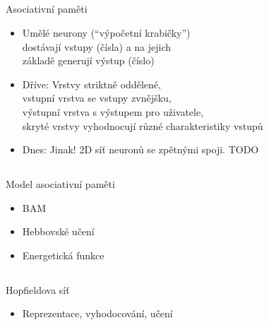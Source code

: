 \documentclass{beamer}
\begin{document}
\subsection{}
\begin{frame}{Asociativní paměti}
\begin{itemize}
\item Umělé neurony (``výpočetní krabičky'') \\ dostávají vstupy (čísla) a na jejich \\ základě generují výstup (číslo)
\item Dříve: Vrstvy striktně oddělené, \\ vstupní vrstva se vstupy zvnějšku, \\ výstupní vrstva s výstupem pro uživatele, \\ skryté vrstvy vyhodnocují různé charakteristiky vstupů
\item Dnes: Jinak! 2D síť neuronů se zpětnými spoji.
	TODO
\end{itemize}
\end{frame}

\subsection{}
\begin{frame}{Model asociativní paměti}
\begin{itemize}
\item BAM
\item Hebbovské učení
\item Energetická funkce
\end{itemize}
\end{frame}

\subsection{}
\begin{frame}{Hopfieldova síť}
\begin{itemize}
\item Reprezentace, vyhodocování, učení
\end{itemize}
\end{frame}
\end{document}
